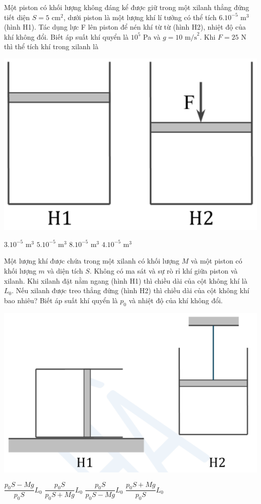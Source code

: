 \documentclass[12pt,a4paper]{article}
\begin{document}
\begin{ex}
	Một piston có khối lượng không đáng kể được giữ trong một xilanh thẳng đứng tiết diện $S = 5 \text{ cm}^2$, dưới piston là một lượng khí lí tưởng có thể tích $6.10^{-5} \text{ m}^3$ (hình H1). Tác dụng lực F lên piston để nén khí từ từ (hình H2), nhiệt độ của khí không đổi. Biết áp suất khí quyển là $10^5$ Pa và $g = 10 \text{ m/s}^2$. Khi $F = 25$ N thì thể tích khí trong xilanh là
		\begin{center}
		\includegraphics[scale=0.3]{img/3.png}
	\end{center}
	\choice
	{$3.10^{-5} \text{ m}^3$}
	{$5.10^{-5} \text{ m}^3$}
	{$8.10^{-5} \text{ m}^3$}
	{$4.10^{-5} \text{ m}^3$}
\end{ex}

\begin{ex}
	Một lượng khí được chứa trong một xilanh có khối lượng $M$ và một piston có khối lượng $m$ và diện tích $S$. Không có ma sát và sự rò rỉ khí giữa piston và xilanh. Khi xilanh đặt nằm ngang (hình H1) thì chiều dài của cột không khí là $L_0$. Nếu xilanh được treo thẳng đứng (hình H2) thì chiều dài của cột không khí bao nhiêu? Biết áp suất khí quyển là $p_0$ và nhiệt độ của khí không đổi.
		\begin{center}
		\includegraphics[scale=0.3]{img/4.png}
	\end{center}
	\choice
	{$\dfrac{p_0S-Mg}{p_0S}L_0$}
	{$\dfrac{p_0S}{p_0S+Mg}L_0$}
	{$\dfrac{p_0S}{p_0S-Mg}L_0$}
	{$\dfrac{p_0S+Mg}{p_0S}L_0$}
\end{ex}
\end{document}

